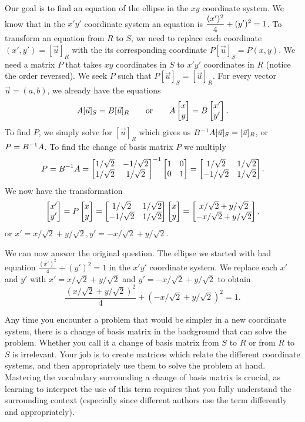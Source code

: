 \begin{example}
Our goal is to find an equation of the ellipse in the $xy$ coordinate system. We know that in the $x'y'$ coordinate system an equation is $\displaystyle \frac{(x')^2}{4}+(y')^2=1$. 
To transform an equation from $R$ to $S$, we need to replace each coordinate $(x',y')=[\vec u]_{R}$ with the its corresponding coordinate $P[\vec u]_{S} = P(x,y)$.  
We need a matrix $P$ that takes $xy$ coordinates in $S$ to $x'y'$ coordinates in $R$ (notice the order reversed).  
We seek $P$ such that $P[\vec u]_{S} = [\vec u]_{R}$. 
For every vector $\vec u =(a,b)$, we already have the equations $$A[\vec u]_{S} = B[\vec u]_{R}\quad \quad \text{or}\quad \quad A\begin{bmatrix} x\\y \end{bmatrix}=B\begin{bmatrix} x'\\y' \end{bmatrix}.$$ 
To find $P$, we simply solve for $[\vec u]_{R}$ which gives us $B^{-1} A[\vec u]_{S} = [\vec u]_{R}$, or $P=B^{-1} A$.   
To find the change of basis matrix $P$ we multiply 
$$P=B^{-1} A = \begin{bmatrix} 1/\sqrt2 &-1/\sqrt2\\1/\sqrt2&1/\sqrt2 \end{bmatrix}^{-1} \begin{bmatrix} 1&0\\0&1 \end{bmatrix} = \begin{bmatrix} 1/\sqrt2 &1/\sqrt2\\-1/\sqrt2&1/\sqrt2 \end{bmatrix}.$$
We now have the transformation 
$$\begin{bmatrix} x'\\y' \end{bmatrix} = P\begin{bmatrix} x\\y \end{bmatrix} = \begin{bmatrix} 1/\sqrt2 &1/\sqrt2\\-1/\sqrt2&1/\sqrt2 \end{bmatrix}\begin{bmatrix} x\\y \end{bmatrix} = \begin{bmatrix} x/\sqrt2+y/\sqrt2\\-x/\sqrt2+y/\sqrt{2} \end{bmatrix},$$
or $x'=x/\sqrt2+y/\sqrt2, y'=-x/\sqrt2+y/\sqrt2$.

We can now answer the original question.  
The ellipse we started with had equation $\frac{(x')^2}{4}+(y')^2=1$ in the $x'y'$ coordinate system.  
We replace each $x'$ and $y'$ with $x'=x/\sqrt2+y/\sqrt2$ and $y'=-x/\sqrt2+y/\sqrt2$ to obtain  $$\frac{(x/\sqrt2+y/\sqrt2)^2}4+(-x/\sqrt2+y/\sqrt2)^2=1.$$
\end{example}

Any time you encounter a problem that would be simpler in a new coordinate system, there is a change of basis matrix in the background that can solve the problem. Whether you call it a change of basis matrix from $S$ to $R$ or from $R$ to $S$ is irrelevant.  Your job is to create matrices which relate the different coordinate systems, and then appropriately use them to solve the problem at hand. Mastering the vocabulary surrounding a change of basis matrix is crucial, as learning to interpret the use of this term requires that you fully understand the surrounding context (especially since different authors use the term differently and appropriately). 
















